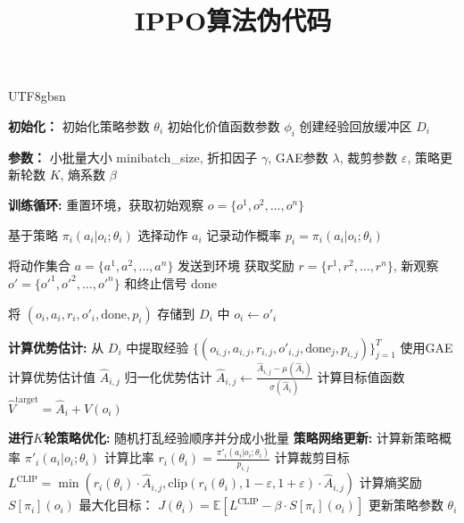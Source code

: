 \documentclass{article}
\begin{document}
\begin{CJK}{UTF8}{gbsn}

\title{IPPO算法伪代码}
\author{}
\date{}
\maketitle

\begin{algorithm}
\caption{IPPO (Independent Proximal Policy Optimization)}
\begin{algorithmic}[1]
\State \textbf{初始化：}
    \State 初始化策略参数 $\theta_i$
    \State 初始化价值函数参数 $\phi_i$
    \State 创建经验回放缓冲区 $D_i$
\EndFor

\State \textbf{参数：} 小批量大小 minibatch\_size, 折扣因子 $\gamma$, GAE参数 $\lambda$, 裁剪参数 $\varepsilon$, 策略更新轮数 $K$, 熵系数 $\beta$

\State \textbf{训练循环:}
    \State 重置环境，获取初始观察 $o = \{o^1, o^2, \ldots, o^n\}$
    
            \State 基于策略 $\pi_i(a_i|o_i;\theta_i)$ 选择动作 $a_i$
            \State 记录动作概率 $p_i = \pi_i(a_i|o_i;\theta_i)$
        \EndFor
        
        \State 将动作集合 $a = \{a^1, a^2, \ldots, a^n\}$ 发送到环境
        \State 获取奖励 $r = \{r^1, r^2, \ldots, r^n\}$, 新观察 $o' = \{o'^1, o'^2, \ldots, o'^n\}$ 和终止信号 done
        
            \State 将 $(o_i, a_i, r_i, o'_i, \text{done}, p_i)$ 存储到 $D_i$ 中
            \State $o_i \leftarrow o'_i$
        \EndFor
    \EndFor

            \State \textbf{计算优势估计:}
            \State 从 $D_i$ 中提取经验 $\{(o_{i,j}, a_{i,j}, r_{i,j}, o'_{i,j}, \text{done}_j, p_{i,j})\}_{j=1}^T$
            \State 使用GAE计算优势估计值 $\hat{A}_{i,j}$
            \State 归一化优势估计 $\hat{A}_{i,j} \leftarrow \frac{\hat{A}_{i,j} - \mu(\hat{A}_i)}{\sigma(\hat{A}_i)}$
            \State 计算目标值函数 $\hat{V}^{\text{target}} = \hat{A}_i + V(o_i)$
            
            \State \textbf{进行$K$轮策略优化:}
                \State 随机打乱经验顺序并分成小批量
                    \State \textbf{策略网络更新:}
                    \State 计算新策略概率 $\pi'_i(a_i|o_i;\theta_i)$
                    \State 计算比率 $r_i(\theta_i) = \frac{\pi'_i(a_i|o_i;\theta_i)}{p_{i,j}}$
                    \State 计算裁剪目标 $L^{\text{CLIP}} = \min\left(r_i(\theta_i) \cdot \hat{A}_{i,j}, \text{clip}(r_i(\theta_i), 1-\varepsilon, 1+\varepsilon) \cdot \hat{A}_{i,j}\right)$
                    \State 计算熵奖励 $S[\pi_i](o_i)$
                    \State 最大化目标： $J(\theta_i) = \mathbb{E}[L^{\text{CLIP}} - \beta \cdot S[\pi_i](o_i)]$
                    \State 更新策略参数 $\theta_i$


\end{algorithmic}
\end{algorithm}
\end{CJK}
\end{document}

